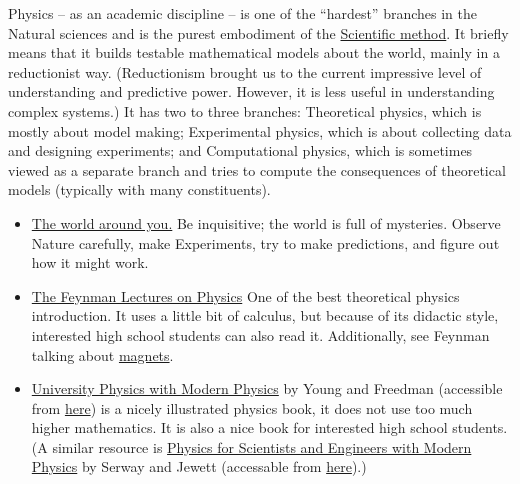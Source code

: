 \documentclass{article}
\begin{document}
Physics -- as an academic discipline -- is one of the ``hardest'' branches in the Natural sciences and is the purest embodiment of the \href{https://plato.stanford.edu/entries/scientific-method/}{Scientific method}.
It briefly means that it builds testable mathematical models about the world, mainly in a reductionist way. (Reductionism brought us to the current impressive level of understanding and predictive power. However, it is less useful in understanding complex systems.)
It has two to three branches: Theoretical physics, which is mostly about model making; Experimental physics, which is about collecting data and designing experiments; and Computational physics, which is sometimes viewed as a separate branch and tries to compute the consequences of theoretical models (typically with many constituents).

\begin{itemize}

\item \underline{The world around you.} Be inquisitive; the world is full of mysteries. Observe Nature carefully, make Experiments, try to make predictions, and figure out how it might work.

\item \href{https://www.feynmanlectures.caltech.edu/}{The Feynman Lectures on Physics} One of the best theoretical physics introduction. It uses a little bit of calculus, but because of its didactic style, interested high school students can also read it. Additionally, see Feynman talking about \href{https://www.youtube.com/watch?v=MO0r930Sn_8}{magnets}.

\item \href{https://www.goodreads.com/book/show/125139.University_Physics_with_Modern_Physics}{University Physics with Modern Physics} by Young and Freedman (accessible from 
 \href{https://web.archive.org/web/20240617180331/https://raw.githubusercontent.com/sonhuytran/MIT8.01SC.2010F/master/References/University%20Physics%20with%20Modern%20Physics,%2013th%20Edition.pdf}{here}) is a nicely illustrated physics book, it does not use too much higher mathematics. It is also a nice book for interested high school students. (A similar resource is \href{https://www.goodreads.com/book/show/23196829-physics-for-scientists-and-engineers-with-modern-physics}{Physics for Scientists and Engineers with Modern Physics} by Serway and Jewett (accessable from \href{https://web.archive.org/web/20211111152634/https://powerunit-ju.com/wp-content/uploads/2019/01/Physics-Textbook-9th-E-GearTeam-ilovepdf-compressed.pdf}{here}).)


\end{itemize}
\end{document}
